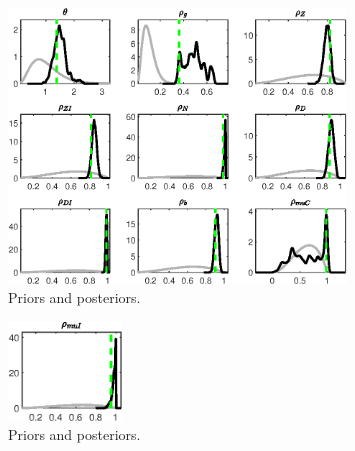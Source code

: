 \begin{figure}[H]
\centering
\includegraphics[width=0.80\textwidth]{BRS_sectoral_wo_fixed_cost/Output/BRS_sectoral_wo_fixed_cost_PriorsAndPosteriors3}
\caption{Priors and posteriors.}\label{Fig:PriorsAndPosteriors:3}
\end{figure}
 
\begin{figure}[H]
\centering
\includegraphics[width=0.27\textwidth]{BRS_sectoral_wo_fixed_cost/Output/BRS_sectoral_wo_fixed_cost_PriorsAndPosteriors4}
\caption{Priors and posteriors.}\label{Fig:PriorsAndPosteriors:4}
\end{figure}
 

